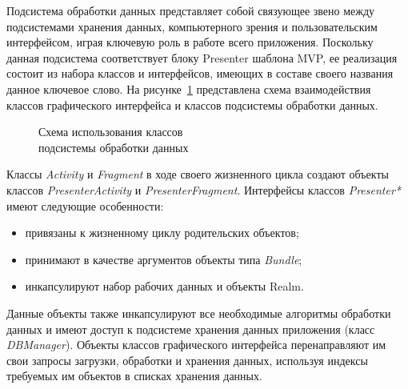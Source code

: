 Подсистема обработки данных представляет собой связующее звено
между подсистемами хранения данных, компьютерного зрения и
пользовательским интерфейсом, играя ключевую роль в работе всего приложения.
Поскольку данная подсистема соответствует блоку Presenter шаблона
MVP, ее реализация состоит из набора классов и интерфейсов,
имеющих в составе своего названия данное ключевое слово.
На рисунке~\ref{fig:implementation_bl_presenter} представлена схема взаимодействия
классов графического интерфейса и классов подсистемы обработки данных.

\begin{figure}[h!]
  \centering
  \caption{Схема использования классов \\ подсистемы обработки данных}
  \label{fig:implementation_bl_presenter}
\end{figure}

Классы \textit{Activity} и \textit{Fragment} в ходе своего жизненного цикла
создают объекты классов \textit{PresenterActivity} и \textit{PresenterFragment}.
Интерфейсы классов \textit{Presenter*} имеют следующие особенности:
\begin{itemize}
  \item привязаны к жизненному циклу родительских объектов;
  \item принимают в качестве аргументов объекты типа \textit{Bundle};
  \item инкапсулируют набор рабочих данных и объекты Realm.
\end{itemize}

Данные объекты также инкапсулируют все необходимые алгоритмы обработки данных и
имеют доступ к подсистеме хранения данных приложения (класс \textit{DBManager}).
Объекты классов графического интерфейса перенаправляют
им свои запросы загрузки, обработки и хранения данных,
используя индексы требуемых им объектов в списках хранения данных.

